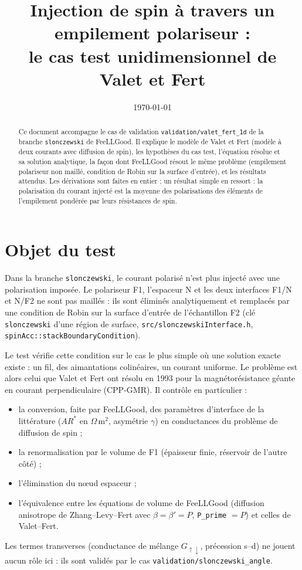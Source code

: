 \documentclass[11pt,a4paper]{article}
\title{Injection de spin à travers un empilement polariseur :\\
  le cas test unidimensionnel de Valet et Fert}
\author{}
\date{\today}
\begin{document}
\maketitle

\begin{abstract}
  Ce document accompagne le cas de validation
  \texttt{validation/valet\_fert\_1d} de la branche \texttt{slonczewski}
  de FeeLLGood. Il explique le modèle de Valet et Fert (modèle à deux
  courants avec diffusion de spin), les hypothèses du cas test, l'équation
  résolue et sa solution analytique, la façon dont FeeLLGood résout le
  même problème (empilement polariseur non maillé, condition de Robin sur
  la surface d'entrée), et les résultats attendus. Les dérivations sont
  faites en entier ; un résultat simple en ressort : la polarisation du
  courant injecté est la moyenne des polarisations des éléments de
  l'empilement pondérée par leurs résistances de spin.
\end{abstract}

\tableofcontents

\section{Objet du test}

Dans la branche \texttt{slonczewski}, le courant polarisé n'est plus
injecté avec une polarisation imposée. Le polariseur F1, l'espaceur N et
les deux interfaces F1/N et N/F2 ne sont pas maillés : ils sont éliminés
analytiquement et remplacés par une condition de Robin sur la surface
d'entrée de l'échantillon F2 (clé \texttt{slonczewski} d'une région de
surface, \texttt{src/slonczewskiInterface.h},
\texttt{spinAcc::stackBoundaryCondition}).

Le test vérifie cette condition sur le cas le plus simple où une solution
exacte existe : un fil, des aimantations colinéaires, un courant uniforme.
Le problème est alors celui que Valet et Fert ont résolu en 1993 pour la
magnétorésistance géante en courant perpendiculaire (CPP-GMR). Il contrôle
en particulier :
\begin{itemize}
  \item la conversion, faite par FeeLLGood, des paramètres d'interface de
    la littérature ($AR^*$ en $\Omega\,$m$^2$, asymétrie $\gamma$) en
    conductances du problème de diffusion de spin ;
  \item la renormalisation par le volume de F1 (épaisseur finie, réservoir
    de l'autre côté) ;
  \item l'élimination du nœud espaceur ;
  \item l'équivalence entre les équations de volume de FeeLLGood (diffusion
    anisotrope de Zhang--Levy--Fert avec $\beta=\beta'=P$,
    \texttt{P\_prime} $=P$) et celles de
    Valet--Fert.
\end{itemize}
Les termes transverses (conductance de mélange $G_{\uparrow\downarrow}$,
précession s--d) ne jouent aucun rôle ici : ils sont validés par le cas
\texttt{validation/slonczewski\_angle}.
\end{document}
